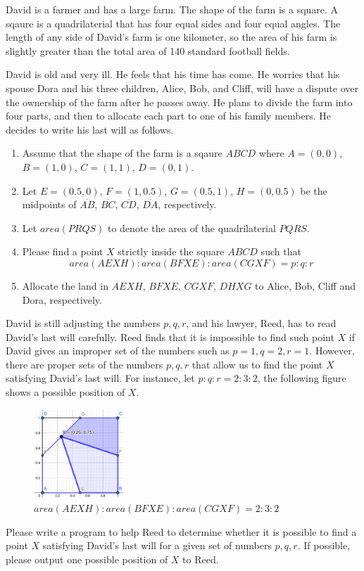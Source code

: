 David is a farmer and has a large farm. The shape of the farm is a square.
A sqaure is a quadrilaterial that has four equal sides and four equal angles.
The length of any side of David's farm is one kilometer, so the area of his farm
is slightly greater than the total area of 140 standard football fields.

David is old and very ill. He feels that his time has come.
He worries that his spouse Dora and his three children, Alice, Bob, and Cliff, 
will have a dispute over the ownership
of the farm after he passes away.
He plans to divide the farm into four parts, 
and then to allocate each part to one of his family members.
He decides to write his last will as follows.
\begin{enumerate}
\tightlist
\item Assume that the shape of the farm is a sqaure $ABCD$ where $A=(0,0)$, $B=(1,0)$, 
$C=(1,1)$, $D=(0,1)$. 
\item Let $E=(0.5,0)$, $F=(1,0.5)$, $G=(0.5,1)$, $H=(0,0.5)$ be the midpoints of 
$\overline{AB}$, $\overline{BC}$, $\overline{CD}$, $\overline{DA}$, respectively.
\item Let $area(PRQS)$ to denote the area of the quadrilaterial $PQRS$.
\item Please find a point $X$ strictly inside the square $ABCD$ such that 
$$area(AEXH):area(BFXE):area(CGXF) = p:q:r$$
\item Allocate the land in $AEXH$, $BFXE$, $CGXF$, $DHXG$ to Alice, Bob, Cliff and Dora,
respectively.
\end{enumerate}

David is still adjusting the numbers $p,q,r$, and his lawyer, Reed, has to read David's
last will carefully. Reed finds that it is impossible to find such point $X$ if 
David gives an improper set of the numbers such as $p=1, q=2, r=1$. 
However, there are proper sets of the numbers $p,q,r$ that allow us to find the point $X$
satisfying David's last will.
For instance, let $p:q:r = 2:3:2$, the following figure shows a possible position of $X$.

\begin{figure}[h]
\center
\includegraphics[width=0.3\textwidth]{image/farm.png}
\caption{$area(AEXH):area(BFXE):area(CGXF) = 2:3:2$}
\end{figure}

Please write a program to help Reed to determine whether it is possible to find
a point $X$ satisfying David's last will for a given set of numbers $p,q,r$.
If possible, please output one possible position of $X$ to Reed.
